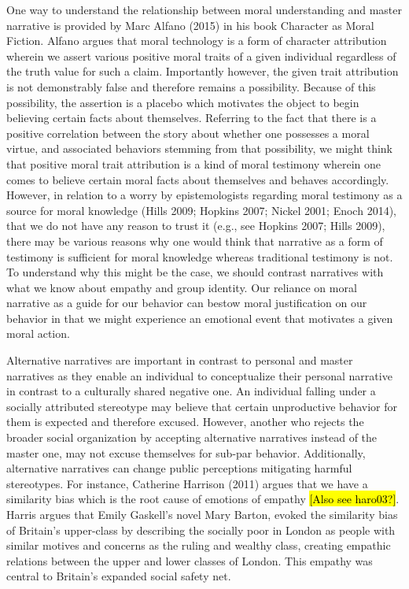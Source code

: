 \documentclass[
  letterpaper,
  DIV=11,
  numbers=noendperiod]{scrartcl}
\theoremstyle{remark}
\begin{document}
One way to understand the relationship between moral understanding and
master narrative is provided by Marc Alfano (2015) in his book Character
as Moral Fiction. Alfano argues that moral technology is a form of
character attribution wherein we assert various positive moral traits of
a given individual regardless of the truth value for such a claim.
Importantly however, the given trait attribution is not demonstrably
false and therefore remains a possibility. Because of this possibility,
the assertion is a placebo which motivates the object to begin believing
certain facts about themselves. Referring to the fact that there is a
positive correlation between the story about whether one possesses a
moral virtue, and associated behaviors stemming from that possibility,
we might think that positive moral trait attribution is a kind of moral
testimony wherein one comes to believe certain moral facts about
themselves and behaves accordingly. However, in relation to a worry by
epistemologists regarding moral testimony as a source for moral
knowledge (Hills 2009; Hopkins 2007; Nickel 2001; Enoch 2014), that we
do not have any reason to trust it (e.g., see Hopkins 2007; Hills 2009),
there may be various reasons why one would think that narrative as a
form of testimony is sufficient for moral knowledge whereas traditional
testimony is not. To understand why this might be the case, we should
contrast narratives with what we know about empathy and group identity.
Our reliance on moral narrative as a guide for our behavior can bestow
moral justification on our behavior in that we might experience an
emotional event that motivates a given moral action.

Alternative narratives are important in contrast to personal and master
narratives as they enable an individual to conceptualize their personal
narrative in contrast to a culturally shared negative one. An individual
falling under a socially attributed stereotype may believe that certain
unproductive behavior for them is expected and therefore excused.
However, another who rejects the broader social organization by
accepting alternative narratives instead of the master one, may not
excuse themselves for sub-par behavior. Additionally, alternative
narratives can change public perceptions mitigating harmful stereotypes.
For instance, Catherine Harrison (2011) argues that we have a similarity
bias which is the root cause of emotions of empathy \hl{{[}Also see
haro03?{]}}. Harris argues that Emily Gaskell's novel Mary Barton,
evoked the similarity bias of Britain's upper-class by describing the
socially poor in London as people with similar motives and concerns as
the ruling and wealthy class, creating empathic relations between the
upper and lower classes of London. This empathy was central to Britain's
expanded social safety net.
\end{document}
